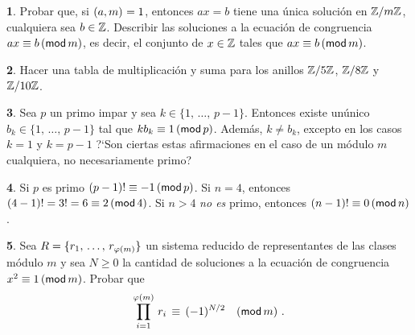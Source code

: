 \theoremstyle{definition}
\newtheorem{ejerModulares}{\ejername}[section]


\begin{ejerModulares}\label{ejer:modulares:lineal}
	Probar que, si $\mcd{a,m}=1$, entonces $ax=b$ tiene una \'unica
	soluci\'on en $\Enterosmod[m]$, cualquiera sea $b\in\Enteros$.
	Describir las soluciones a la ecuaci\'on de congruencia
	$ax\equiv b\tmodulo[m]$, es decir, el conjunto de $x\in\Enteros$
	tales que $ax\equiv b\tmodulo[m]$.
\end{ejerModulares}

\begin{ejerModulares}
	Hacer una tabla de multiplicaci\'on y suma para los anillos
	$\Enterosmod[5]$, $\Enterosmod[8]$ y $\Enterosmod[10]$.
\end{ejerModulares}

\begin{ejerModulares}
	Sea $p$ un primo impar y sea $k\in\{1,\,\dots,\,p-1\}$. Entonces
	existe un\'unico $b_k\in\{1,\,\dots,\,p-1\}$ tal que
	$kb_k\equiv 1\tmodulo[p]$. Adem\'as, $k\neq b_k$, excepto en los
	casos $k=1$ y $k=p-1$ ?`Son ciertas estas afirmaciones en el caso
	de un m\'odulo $m$ cualquiera, no necesariamente primo?
\end{ejerModulares}

\begin{ejerModulares}
	Si $p$ es primo $(p-1)!\equiv -1\tmodulo[p]$. Si $n=4$, entonces
	$(4-1)!=3!=6\equiv 2\tmodulo[4]$. Si $n>4$ \emph{no es} primo,
	entonces $(n-1)!\equiv 0\tmodulo[n]$.
\end{ejerModulares}

\begin{ejerModulares}
	Sea $R=\{\lista r{\eulerphi(m)}\}$ un sistema reducido de
	representantes de las clases m\'odulo $m$ y sea $N\geq 0$ la
	cantidad de soluciones a la ecuaci\'on de congruencia
	$x^2\equiv 1\tmodulo[m]$. Probar que%
	\begin{displaymath}
		\prod_{i=1}^{\eulerphi(m)}\,r_i\,\equiv\,(-1)^{N/2}\modulo[m]
		\text{ .}
	\end{displaymath}
\end{ejerModulares}


